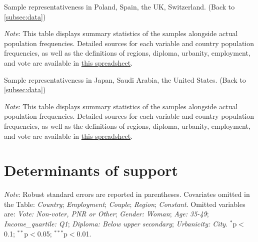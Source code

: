 \begin{table}[h!]
    \caption[Sample representativeness in PL, ES, GB, CH]{Sample representativeness in Poland, Spain, the UK, Switzerland. (Back to \ref{subsec:data}) } \label{tab:representativeness_2}
    \makebox[\textwidth][c]{\resizebox*{!}{.60\textheight}{}}
    {\footnotesize \textit{Note}: This table displays summary statistics of the samples alongside actual population frequencies. 
    Detailed sources for each variable and country population frequencies, as well as the definitions of regions, diploma, urbanity, employment, and vote are available in \href{https://github.com/bixiou/robustness_global_redistr/raw/main/questionnaire/sources.xlsx}{this spreadsheet}. 
    } 
\end{table}

\begin{table}[h!]
    \caption[Sample representativeness in JP, SA, US]{Sample representativeness in Japan, Saudi Arabia, the United States. (Back to \ref{subsec:data}) } \label{tab:representativeness_3}
    \makebox[\textwidth][c]{\resizebox*{!}{.80\textheight}{}}
    {\footnotesize \textit{Note}: This table displays summary statistics of the samples alongside actual population frequencies. 
    Detailed sources for each variable and country population frequencies, as well as the definitions of regions, diploma, urbanity, employment, and vote are available in \href{https://github.com/bixiou/robustness_global_redistr/raw/main/questionnaire/sources.xlsx}{this spreadsheet}. 
    } 
\end{table}
\clearpage
\section{Determinants of support}\label{app:determinants}

\begin{table}[h]\label{tab:determinant}
    \caption[Correlates of support for global redistribution]{Correlates of support for global redistribution (multivariate OLS regressions). %
    } 
    \makebox[\textwidth][c]{
\resizebox*{!}{.67\textheight}{ 
        
        }
    }
    {\footnotesize \textit{Note}: Robust standard errors are reported in parentheses. Covariates omitted in the Table: \textit{Country}; \textit{Employment}; \textit{Couple}; \textit{Region}; \textit{Constant}. Omitted variables are: \textit{Vote: Non-voter, PNR or Other}; \textit{Gender: Woman}; \textit{Age: 35-49}; \textit{Income\_quartile: Q1}; \textit{Diploma: Below upper secondary}; \textit{Urbanicity: City}. \hfill $^{*}$p$<$0.1; $^{**}$p$<$0.05; $^{***}$p$<$0.01.
    }
\end{table}


